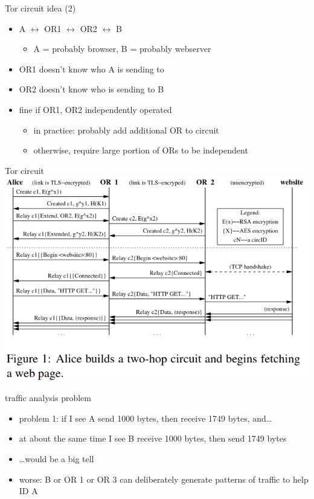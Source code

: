 \begin{frame}{Tor circuit idea (2)}
    \begin{itemize}
    \item A $\leftrightarrow$ OR1 $\leftrightarrow$ OR2 $\leftrightarrow$ B
        \begin{itemize}
        \item A = probably browser, B = probably webserver
        \end{itemize}
    \vspace{.5cm}
    \item OR1 doesn't know who A is sending to
    \item OR2 doesn't know who is sending to B
    \item fine if OR1, OR2 independently operated
        \begin{itemize}
        \item in practice: probably add additional OR to circuit
        \item otherwise, require large portion of ORs to be independent
        \end{itemize}
    \end{itemize}
\end{frame}

\begin{frame}{Tor circuit}
\includegraphics[height=0.9\textheight]{../encap/tor-fig1}
\end{frame}

\begin{frame}{traffic analysis problem}
    \begin{itemize}
    \item problem 1: if I see A send 1000 bytes, then receive 1749 bytes, and\ldots
    \item at about the same time I see B receive 1000 bytes, then send 1749 bytes
    \item \ldots would be a big tell
    \vspace{.5cm}
    \item worse: B or OR 1 or OR 3 can deliberately generate patterns of traffic to help ID A
    \end{itemize}
\end{frame}

